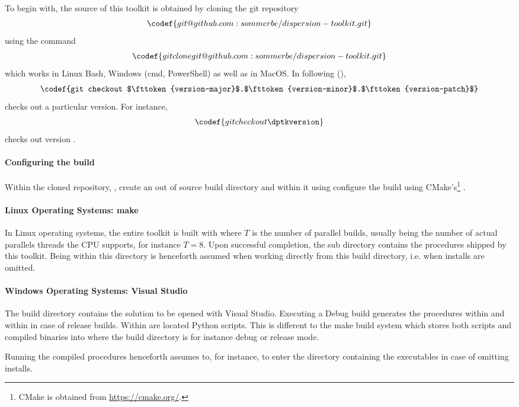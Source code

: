 To begin with, the source of this toolkit is obtained by cloning the git repository
\begin{align*}
  \codef{git@github.com:sommerbe/dispersion-toolkit.git}
\end{align*}
using the command
\begin{align*}
  \codef{git clone git@github.com:sommerbe/dispersion-toolkit.git}
\end{align*}
which works in Linux Bash, Windows (cmd, PowerShell) as well as in MacOS. In following (),
\begin{align*}
  \codef{git checkout $\fttoken{version-major}$.$\fttoken{version-minor}$.$\fttoken{version-patch}$}
\end{align*}
checks out a particular version. For instance,
\begin{align*}
  \codef{git checkout \dptkversion}
\end{align*}
checks out version \codef{\dptkversion}.

\paragraph{Configuring the build}

Within the cloned repository,
,
create an out of source build directory
and within it using
configure the build using CMake's\footnote{CMake is obtained from \href{https://cmake.org/}{https://cmake.org/}.}
.


\paragraph{Linux Operating Systems: make}

In Linux operating systems, the entire toolkit is built with
where $T$ is the number of parallel builds, usually being the number of actual parallels threads the CPU supports, for instance $T=8$. Upon successful completion, the sub directory
contains the procedures shipped by this toolkit. Being within this directory is henceforth assumed when working directly from this build directory, i.e. when installs are omitted.


\paragraph{Windows Operating Systems: Visual Studio}

The build directory contains the solution
to be opened with Visual Studio. Executing a Debug build generates the procedures within
and within
in case of release builds. Within
are located Python scripts. This is different to the make build system which stores both scripts and compiled binaries into  where the build directory  is for instance debug or release mode.

Running the compiled procedures henceforth assumes to, for instance,
to enter the directory containing the executables in case of omitting installs.

